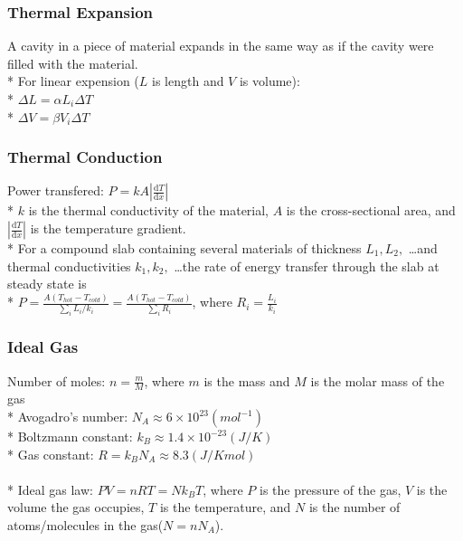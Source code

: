 \subsubsection{Thermal Expansion}
A cavity in a piece of material expands in the same way as if the cavity were filled with the material.\\*
For linear expension (\(L\) is length and \(V\) is volume):\\*
\(\displaystyle \Delta L=\alpha L_{i}\Delta T\)\\*
\(\displaystyle \Delta V=\beta V_{i}\Delta T\)
\newpage
\subsubsection{Thermal Conduction}
Power transfered: \(\displaystyle P=kA\left|\frac{\mathrm{d}T}{\mathrm{d}x}\right|\)\\*
\(k\) is the thermal conductivity of the material, \(A\) is the cross-sectional area, and \(\left|\frac{\mathrm{d}T}{\mathrm{d}x}\right|\) is the temperature gradient.\\*
For a compound slab containing several materials of thickness \(L_1, L_2,\) \ldots and thermal conductivities \(k_1, k_2,\) \ldots the rate of energy transfer through the slab at steady state is\\*
\(\displaystyle P=\frac{A(T_{hot}-T_{cold})}{\sum_{i}{L_i/k_i}}=\frac{A(T_{hot}-T_{cold})}{\sum_{i}{R_i}}\), where \(\displaystyle R_i=\frac{L_i}{k_i}\)

\subsubsection{Ideal Gas}
Number of moles: \(\displaystyle n=\frac{m}{M}\), where \(m\) is the mass and \(M\) is the molar mass of the gas\\*
Avogadro's number: \(\displaystyle N_{A}\approx6\times10^{23}(mol^{-1})\)\\*
Boltzmann constant:  \(\displaystyle k_{B} \approx 1.4\times10^{-23}  (J/K)\)\\*
Gas constant:  \(\displaystyle R=k_{B}N_{A} \approx 8.3 (J/K mol)\)\\\\*
Ideal gas law: \(\displaystyle PV=nRT=Nk_{B}T \), where \(P\) is the pressure of the gas, \(V\) is the volume the gas occupies, \(T\) is the temperature, and \(N\) is the number of atoms/molecules in the gas(\(N=nN_{A}\)).

